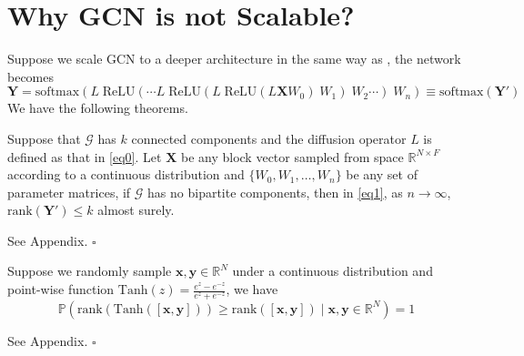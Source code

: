\documentclass{article}
\newcommand\doubleP{\mathbb{P}}
\newenvironment{theorem}[2][Theorem]{\begin{trivlist}
		\item[\hskip \labelsep {\bfseries #1}\hskip \labelsep {\bfseries #2.}]}{\end{trivlist}}
\newenvironment{proof}{{\noindent\it Proof}\quad}{\hfill $\square$\par}
\begin{document}
\section{Why GCN is not Scalable?}
Suppose we scale GCN to a deeper architecture in the same way as \cite{kipf2016classification, li2018deeper}, the network becomes
\begin{equation}\label{eq1}
\bm{Y} = \text{softmax} ({L} \; \text{ReLU} ( \cdots L \; \text{ReLU} (L\; \text{ReLU} (L \bm{X} W_0 ) \; W_1 )\; W_2 \cdots ) \; W_n ) \equiv  \text{softmax} (\bm{Y'})
\end{equation}
We have the following theorems.
\begin{theorem} 1 \label{thm1}
Suppose that $\mathcal{G}$ has $k$ connected components and the diffusion operator $L$ is defined as that in \eqref{eq0}. Let $\bm{X}$ be any block vector sampled from space $\mathbb{R}^{N \times F}$ according to a continuous distribution and $\{W_0, W_1, \dots, W_n\}$ be any set of parameter matrices, if $\mathcal{G}$ has no bipartite components, then in \eqref{eq1}, as $n \to \infty$, $\text{rank}(\bm{Y'}) \leq k$ almost surely.
\end{theorem}	
\begin{proof}
See Appendix.
\end{proof}

\begin{theorem} 2
\label{thm2}
Suppose we randomly sample $\bm{x}, \bm{y} \in \mathbb{R}^N$ under a continuous distribution and point-wise function $\text{Tanh}(z) = \frac{e^z - e^{-z}}{e^z + e^{-z}}$, we have
$$\doubleP(\text{rank}\left(\text{Tanh}([\bm{x},\bm{y}])\right) \geq \text{rank}([\bm{x},\bm{y}]) \;|\; \bm{x},\bm{y} \in \mathbb{R}^N) = 1$$
\end{theorem}

\begin{proof}
See Appendix.
\end{proof}
\end{document}
